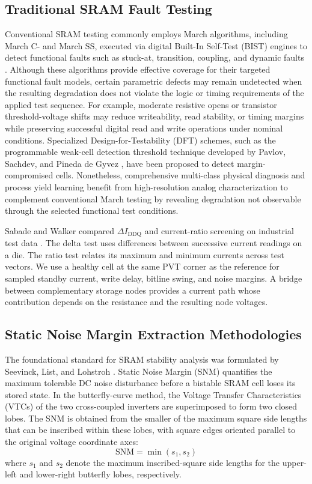 \documentclass[conference]{IEEEtran}
\begin{document}
\subsection{Traditional SRAM Fault Testing}
Conventional SRAM testing commonly employs March algorithms, including March C- and March SS, executed via digital Built-In Self-Test (BIST) engines to detect functional faults such as stuck-at, transition, coupling, and dynamic faults \cite{vandegoor1993march, vandegoor2000functional, hamdioui2003dynamic}. Although these algorithms provide effective coverage for their targeted functional fault models, certain parametric defects may remain undetected when the resulting degradation does not violate the logic or timing requirements of the applied test sequence. For example, moderate resistive opens or transistor threshold-voltage shifts may reduce writeability, read stability, or timing margins while preserving successful digital read and write operations under nominal conditions. Specialized Design-for-Testability (DFT) schemes, such as the programmable weak-cell detection threshold technique developed by Pavlov, Sachdev, and Pineda de Gyvez \cite{pavlov2004sram}, have been proposed to detect margin-compromised cells. Nonetheless, comprehensive multi-class physical diagnosis and process yield learning benefit from high-resolution analog characterization to complement conventional March testing by revealing degradation not observable through the selected functional test conditions.

Sabade and Walker compared $\Delta I_{\mathrm{DDQ}}$ and current-ratio screening on industrial test data \cite{sabade2004comparison}. The delta test uses differences between successive current readings on a die. The ratio test relates its maximum and minimum currents across test vectors. We use a healthy cell at the same PVT corner as the reference for sampled standby current, write delay, bitline swing, and noise margins. A bridge between complementary storage nodes provides a current path whose contribution depends on the resistance and the resulting node voltages.

\subsection{Static Noise Margin Extraction Methodologies}
The foundational standard for SRAM stability analysis was formulated by Seevinck, List, and Lohstroh \cite{seevinck1987static}. Static Noise Margin (SNM) quantifies the maximum tolerable DC noise disturbance before a bistable SRAM cell loses its stored state. In the butterfly-curve method, the Voltage Transfer Characteristics (VTCs) of the two cross-coupled inverters are superimposed to form two closed lobes. The SNM is obtained from the smaller of the maximum square side lengths that can be inscribed within these lobes, with square edges oriented parallel to the original voltage coordinate axes:
\begin{equation}
\text{SNM} = \min(s_1, s_2)
\label{eq:snm_def}
\end{equation}
where $s_1$ and $s_2$ denote the maximum inscribed-square side lengths for the upper-left and lower-right butterfly lobes, respectively.
\end{document}
